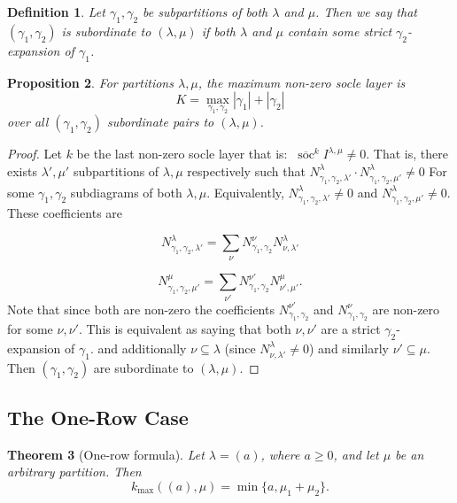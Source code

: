 \documentclass[a4paper,12pt]{article}
\theoremstyle{plain}
\newtheorem{theorem}{Theorem}[section]
\newtheorem{definition}[theorem]{Definition}
\newtheorem{proposition}[theorem]{Proposition}
\theoremstyle{remark}
\begin{document}
\begin{definition}
    Let $\gamma_1, \gamma_2$ be subpartitions of both $\lambda$ and $\mu$. Then we say that $(\gamma_1, \gamma_2)$  is subordinate to $(\lambda, \mu)$ if both $\lambda$ and $\mu$ contain some strict  $\gamma_2$-expansion of $\gamma_1$.
\end{definition}

\begin{proposition}
    For partitions $\lambda, \mu$, the maximum non-zero socle layer is 
    $$
    K = \operatorname*{max}_{\gamma_1, \gamma_2} |\gamma_1| + |\gamma_2| 
    $$
    over all  $(\gamma_1, \gamma_2)$ subordinate pairs to $(\lambda, \mu)$.
\end{proposition}
\begin{proof}
    Let $k$ be the last non-zero socle layer that is: $\: \overline{\operatorname{soc}}^k I^{\lambda, \mu} \neq 0$. That is, there exists $\lambda', \mu'$ subpartitions of $\lambda, \mu$ respectively such that $N^\lambda_{\gamma_1, \gamma_2, \lambda'} \cdot N^\lambda_{\gamma_1, \gamma_2, \mu'} \neq 0$ For some $\gamma_1, \gamma_2$ subdiagrams of both $\lambda, \mu$. Equivalently, $N^\lambda_{\gamma_1, \gamma_2, \lambda'} \neq 0$ and $N^\lambda_{\gamma_1, \gamma_2, \mu'} \neq 0$. These coefficients are 

    $$
    N^{\lambda}_{\gamma_1, \gamma_2, \lambda'} = \sum_{\nu} N^{\nu}_{\gamma_1,\gamma_2} N^{\lambda}_{\nu, \lambda'}
    $$

    $$
    N^{\mu}_{\gamma_1, \gamma_2, \mu'} = \sum_{\nu'} N^{\nu'}_{\gamma_1,\gamma_2} N^{\mu}_{\nu', \mu'}.
    $$
    Note that since both are non-zero the coefficients $N^{\nu'}_{\gamma_1,\gamma_2}$ and $N^{\nu}_{\gamma_1,\gamma_2}$ are non-zero for some $\nu,\nu'$. This is equivalent as saying that both $\nu,\nu'$ are a strict $\gamma_2$-expansion of $\gamma_1$. and additionally $\nu \subseteq \lambda$ (since $N^{\lambda}_{\nu, \lambda'} \neq 0$) and similarly $\nu' \subseteq \mu$. 
    Then $(\gamma_1, \gamma_2)$ are subordinate to  $(\lambda, \mu)$.
\end{proof}

\subsection{The One-Row Case}

\begin{theorem}[One-row formula]
Let $\lambda=(a)$, where $a\geq 0$, and let $\mu$
be an arbitrary partition. Then
\begin{equation}
\boxed{
k_{\max}((a),\mu)
=
\min\{a,\mu_1+\mu_2\}.
}
\end{equation}
\end{theorem}
\end{document}
